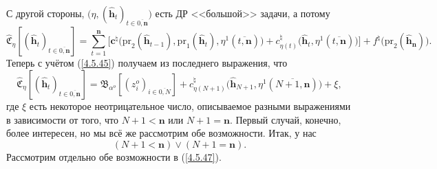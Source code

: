 \documentclass[12pt,twoside]{report}
\newcommand{\bfn}{\begin{equation}}
\newcommand{\efn}{\end{equation}}
\newcommand{\ov}{\overline}
\newcommand{\al}{\alpha}
\begin{document}
{{\begin{eqnarray}
&\label{4.5.45}
\end{eqnarray}
С другой стороны, $\bigl(\eta,(\hat{\mathbf{h}}_t)_{t\in\ov{0,
\mathbf{n}}}\bigl)$ есть ДР <<большой>> задачи, а потому
$$\widehat{\mathfrak{C}}_\eta[(\hat{\mathbf{h}}_t)_{t\in\ov{0,\mathbf{n}}}] =
\sum\limits_{t=1}^\mathbf{n}\bigl[\mathbf{c}^\natural\bigl(\mathrm{pr}_2(\hat{\mathbf{h}}_{t-1}),
\mathrm{pr}_1(\hat{\mathbf{h}}_t),\eta^1(\ov{t,\mathbf{n}})\bigl) +
c_{\eta(t)}^\natural\bigl(\hat{\mathbf{h}}_t,\eta^1(\ov{t,\mathbf{n}})\bigl)\bigl]+
f^\natural\bigl(\mathrm{pr}_2(\hat{\mathbf{h}}_\mathbf{n})\bigl).
$$
Теперь с учётом (\ref{4.5.45}) получаем из последнего выражения, что
\bfn\label{4.5.46}\widehat{\mathfrak{C}}_\eta[(\hat{\mathbf{h}}_t)_{t\in\ov{0,\mathbf{n}}}] =
\mathfrak{B}_{\al^o}[(z_i^o)_{i\in\ov{0,N}}] + c_{\eta(N+1)}^\natural\bigl(\hat{\mathbf{h}}_{N+1},
\eta^1(\ov{N+1,\mathbf{n}})\bigl)  + \xi,
\efn
где $\xi$ есть некоторое неотрицательное число, описываемое разными выражениями в зависимости
от того, что $N+1 <\mathbf{n}$  или $N+1 = \mathbf{n}.$ Первый случай, конечно, более
интересен, но мы всё же рассмотрим обе возможности. Итак, у нас
\bfn\label{4.5.47}(N+1 <\mathbf{n}) \vee (N+1 = \mathbf{n}).
\efn
Рассмотрим отдельно обе возможности в (\ref{4.5.47}).

}}
\end{document}
